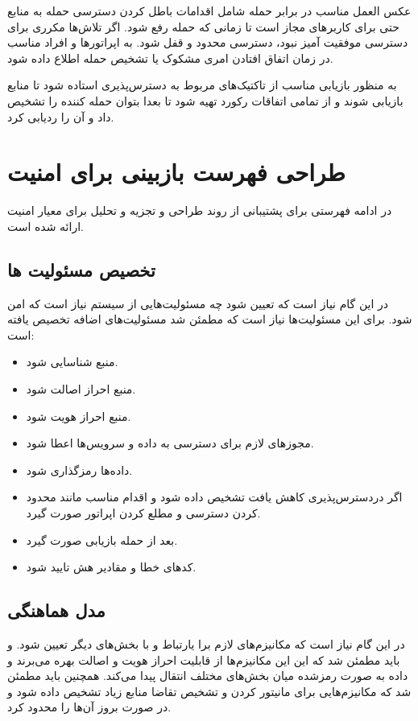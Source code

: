عکس العمل مناسب در برابر حمله شامل اقدامات باطل کردن دسترسی حمله به منابع حتی برای کاربرهای مجاز است تا زمانی که حمله رفع شود. 
اگر تلاش‌ها مکرری برای دسترسی موفقیت آمیز نبود، دسترسی محدود و قفل شود. به اپراتورها و افراد مناسب در زمان اتفاق افتادن امری مشکوک یا تشخیص حمله اطلاع داده شود.

به منظور بازیابی مناسب از تاکتیک‌های مربوط به دسترس‌پذیری استاده شود تا  منابع بازیابی شوند و از تمامی اتفاقات رکورد تهیه شود تا بعدا بتوان حمله کننده را تشخیص داد و آن را ردیابی کرد.

\section{طراحی فهرست بازبینی برای امنیت}

در ادامه فهرستی برای پشتیبانی از روند طراحی و تجزیه و تحلیل برای معیار امنیت ارائه شده است.


\subsection{تخصیص مسئولیت ها} 
در این گام نیاز است که تعیین شود چه مسئولیت‌هایی از سیستم نیاز است که امن شود. برای این مسئولیت‌ها نیاز است که مطمئن شد مسئولیت‌های اضافه تخصیص یافته است:
\begin{itemize}
\item
منبع شناسایی شود.
\item
منبع احراز اصالت شود.
\item
منبع احراز هویت شود.
\item
مجوز‌های لازم برای دسترسی به داده و سرویس‌ها اعطا شود.
\item
داده‌ها رمزگذاری شود.
\item 
اگر دردسترس‌پذیری کاهش یافت تشخیص داده شود و اقدام مناسب مانند محدود کردن دسترسی و مطلع کردن اپراتور صورت گیرد.
\item
بعد از حمله بازیابی صورت گیرد.
\item
کدهای خطا و مقادیر هش تایید شود.
\end{itemize}
\subsection{مدل هماهنگی}
در این گام نیاز است که مکانیزم‌های لازم برا یارتباط و با بخش‌های دیگر تعیین شود. و باید مطمئن شد که این این مکانیزم‌ها از قابلیت احراز هویت و اصالت بهره می‌برند و داده به صورت رمزشده میان بخش‌های مختلف انتقال پیدا می‌کند.
همچنین باید مطمئن شد که مکانیزم‌هایی برای مانیتور کردن و تشخیص تقاضا منابع زیاد تشخیص داده شود و در صورت بروز آن‌ها را محدود کرد.

